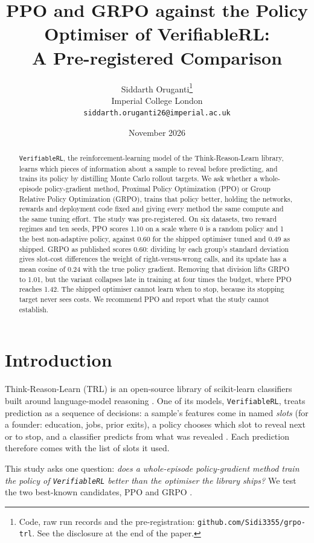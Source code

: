 \documentclass[11pt,a4paper]{article}
\title{\textbf{PPO and GRPO against the Policy Optimiser of VerifiableRL:\\ A Pre-registered Comparison}}
\author{Siddarth Oruganti\thanks{Code, raw run records and the pre-registration:
\texttt{github.com/Sidi3355/grpo-trl}. See the disclosure at the end of the paper.}\\[2pt]
Imperial College London\\
\texttt{siddarth.oruganti26@imperial.ac.uk}}
\date{November 2026}
\begin{document}
\maketitle

\begin{abstract}
\texttt{VerifiableRL}, the reinforcement-learning model of the Think-Reason-Learn library, learns which pieces
of information about a sample to reveal before predicting, and trains its policy by distilling Monte Carlo rollout
targets. We ask whether a whole-episode policy-gradient method, Proximal Policy Optimization (PPO) or Group
Relative Policy Optimization (GRPO), trains that policy better, holding the networks, rewards and deployment code
fixed and giving every method the same compute and the same tuning effort. The study was pre-registered. On six
datasets, two reward regimes and ten seeds, PPO scores 1.10 on a scale where 0 is a random policy and 1 the best
non-adaptive policy, against 0.60 for the shipped optimiser tuned and 0.49 as shipped. GRPO as published scores
0.60: dividing by each group's standard deviation gives slot-cost differences the weight of right-versus-wrong
calls, and its update has a mean cosine of 0.24 with the true policy gradient. Removing that division lifts GRPO
to 1.01, but the variant collapses late in training at four times the budget, where PPO reaches 1.42. The shipped
optimiser cannot learn when to stop, because its stopping target never sees costs. We recommend PPO and report
what the study cannot establish.
\end{abstract}

\section{Introduction}

Think-Reason-Learn (TRL) is an open-source library of scikit-learn classifiers built around language-model
reasoning \citep{trl2026}. One of its models, \texttt{VerifiableRL}, treats prediction as a sequence of
decisions: a sample's features come in named \emph{slots} (for a founder: education, jobs, prior exits), a policy
chooses which slot to reveal next or to stop, and a classifier predicts from what was revealed
\citep{ye2026learning}. Each prediction therefore comes with the list of slots it used.

This study asks one question: \emph{does a whole-episode policy-gradient method train the policy of
\texttt{VerifiableRL} better than the optimiser the library ships?} We test the two best-known candidates, PPO
\citep{schulman2017ppo} and GRPO \citep{shao2024deepseekmath}.
\end{document}
